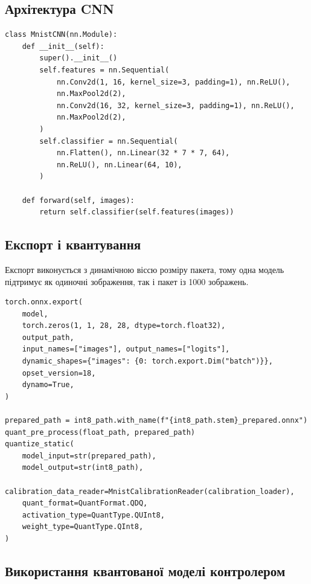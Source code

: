 \documentclass[12pt,a4paper]{article}
\begin{document}
\subsection{Архітектура CNN}

\begin{listing}[H]
\begin{verbatim}
class MnistCNN(nn.Module):
    def __init__(self):
        super().__init__()
        self.features = nn.Sequential(
            nn.Conv2d(1, 16, kernel_size=3, padding=1), nn.ReLU(),
            nn.MaxPool2d(2),
            nn.Conv2d(16, 32, kernel_size=3, padding=1), nn.ReLU(),
            nn.MaxPool2d(2),
        )
        self.classifier = nn.Sequential(
            nn.Flatten(), nn.Linear(32 * 7 * 7, 64),
            nn.ReLU(), nn.Linear(64, 10),
        )

    def forward(self, images):
        return self.classifier(self.features(images))
\end{verbatim}
\caption{Архітектура згорткової нейронної мережі}
\end{listing}

\subsection{Експорт і квантування}

Експорт виконується з динамічною віссю розміру пакета, тому одна модель
підтримує як одиночні зображення, так і пакет із 1000 зображень.

\begin{listing}[H]
\begin{verbatim}
torch.onnx.export(
    model,
    torch.zeros(1, 1, 28, 28, dtype=torch.float32),
    output_path,
    input_names=["images"], output_names=["logits"],
    dynamic_shapes={"images": {0: torch.export.Dim("batch")}},
    opset_version=18,
    dynamo=True,
)

prepared_path = int8_path.with_name(f"{int8_path.stem}_prepared.onnx")
quant_pre_process(float_path, prepared_path)
quantize_static(
    model_input=str(prepared_path),
    model_output=str(int8_path),
    calibration_data_reader=MnistCalibrationReader(calibration_loader),
    quant_format=QuantFormat.QDQ,
    activation_type=QuantType.QUInt8,
    weight_type=QuantType.QInt8,
)
\end{verbatim}
\caption{Експорт ONNX і статичне INT8-квантування}
\end{listing}

\subsection{Використання квантованої моделі контролером}
\end{document}
